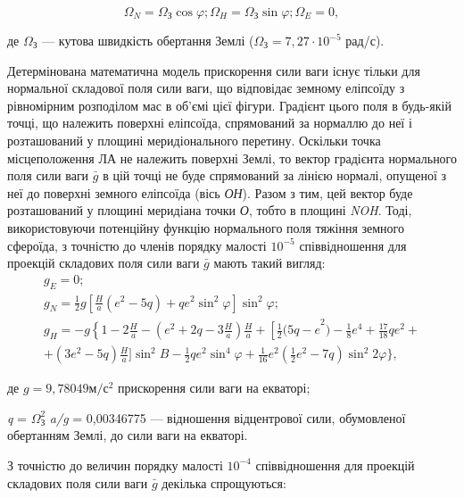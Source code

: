 \[\Omega_{N} =\Omega_{\text{З}}\cos \varphi;
\Omega_{H} =\Omega_{\text{З}}\sin \varphi; 
\Omega_{E} =0,\] 

\begin{ESKDexplanation}
 \item де  $\Omega_{\text{З}} $ --- кутова швидкість обертання Землі ($\Omega_{\text{З}}=7,27 \cdot 10^{-5}$ рад/с).
\end{ESKDexplanation}

Детермінована математична модель прискорення сили ваги існує тільки для нормальної 
складової поля сили ваги, що відповідає земному еліпсоїду з рівномірним розподілом 
мас в об'ємі цієї фігури. Градієнт цього поля в будь-якій точці, що належить поверхні 
еліпсоїда, спрямований за нормаллю до неї і розташований у площині меридіонального 
перетину. Оскільки точка місцеположення ЛА не належить поверхні Землі, то вектор 
градієнта нормального поля сили ваги $\bar{g}$ в цій точці не буде спрямований за 
лінією нормалі, опущеної з неї до поверхні земного еліпсоїда (вісь \textit{ОН}). 
Разом з тим, цей вектор буде розташований у площині меридіана точки \textit{О}, тобто 
в площині \textit{NOH}. Тоді, використовуючи  потенційну функцію нормального поля 
тяжіння земного сфероїда, з точністю до членів порядку малості $10^{-5}$  співвідношення 
для проекцій складових поля сили ваги $\bar{g}$ мають такий вигляд:
\[\begin{array}{l} 
{g_{E} =0;} \\
{g_{N} =\frac{1}{2} g[\frac{H}{a} (e^{2} -5q)+qe^{2} \sin^{2}\varphi]\sin^2\varphi;}\\
{g_{H} =-g\left\{1-2\frac{H}{a} -\right. (e^{2} +2q-3\frac{H}{a})
\frac{H}{a} +\left[\frac{1}{2} (5q-e\right. ^{2} )-\frac{1}{8} e^{4} +\frac{17}{18}qe^{2} +} \\ 
{ +(3e^{2} - 5q)\frac{H}{a} ]\sin ^{2} B-\frac{1}{2} qe^{2} \sin ^{4} \varphi+\frac{1}{16} e^{2} 
(\frac{1}{2} e^{2} -7q)\sin ^{2} 2\varphi\},} 
\end{array}\]
\begin{ESKDexplanation}
\item де $g= 9,78049 \text{м}/\text{с}^{2}$ прискорення сили ваги на екваторі; 
\item \textit{q} = $\Omega_{\text{З}}^{2} $ \textit{a/g} = 0,00346775 --- відношення 
відцентрової сили, обумовленої обертанням Землі, до сили ваги на екваторі. 
\end{ESKDexplanation}

З точністю до величин порядку малості $10^{-4}$ співвідношення для проекцій складових 
поля сили ваги $\bar{g}$ декілька спрощуються:

